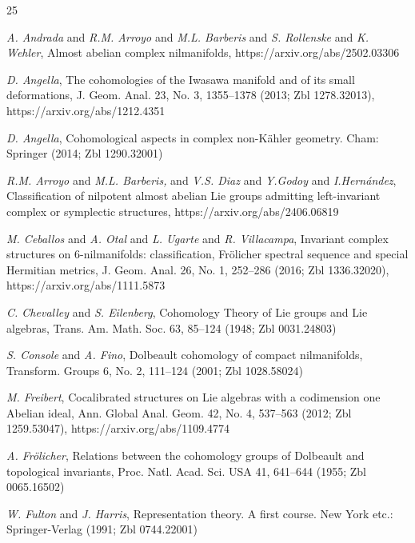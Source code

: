 \documentclass[leqno]{article}
\theoremstyle{definition}
\numberwithin{equation}{section}
\begin{document}
\begin{thebibliography}{25}

\textit{A. Andrada} and \textit{R.M. Arroyo} and \textit{M.L. Barberis} and \textit{S. Rollenske} and \textit{K. Wehler}, Almost abelian complex nilmanifolds, 
{\footnotesize\sf https://arxiv.org/abs/2502.03306} 

\textit{D. Angella}, The cohomologies of the Iwasawa manifold and of its small deformations, J. Geom. Anal. 23, No. 3, 1355--1378 (2013; Zbl 1278.32013),
{\footnotesize\sf https://arxiv.org/abs/1212.4351} 

\textit{D. Angella}, Cohomological aspects in complex non-Kähler geometry. Cham: Springer (2014; Zbl 1290.32001)

\textit{R.M. Arroyo} and \textit{M.L. Barberis,} and \textit{V.S. Diaz} and \textit{Y.Godoy} and \textit{I.Hernández}, Classification of nilpotent almost abelian Lie groups admitting left-invariant complex or symplectic structures, {\footnotesize\sf https://arxiv.org/abs/2406.06819} 

\textit{M. Ceballos} and \textit{A. Otal} and \textit{L. Ugarte} and \textit{R. Villacampa}, Invariant complex structures on 6-nilmanifolds: classification, Frölicher spectral sequence and special Hermitian metrics, J. Geom. Anal. 26, No. 1, 252--286 (2016; Zbl 1336.32020),
{\footnotesize\sf https://arxiv.org/abs/1111.5873} 

\textit{C. Chevalley} and \textit{S. Eilenberg}, Cohomology Theory of Lie groups and Lie algebras, Trans. Am. Math. Soc. 63, 85--124 (1948; Zbl 0031.24803)

\textit{S. Console} and \textit{A. Fino}, Dolbeault cohomology of compact nilmanifolds, Transform. Groups 6, No. 2, 111--124 (2001; Zbl 1028.58024)

 \textit{M. Freibert}, Cocalibrated structures on Lie algebras with a codimension one Abelian ideal, Ann. Global Anal. Geom. 42, No. 4, 537--563 (2012; Zbl 1259.53047),
{\footnotesize\sf https://arxiv.org/abs/1109.4774} 

\textit{A. Frölicher}, Relations between the cohomology groups of Dolbeault and topological invariants, Proc. Natl. Acad. Sci. USA 41, 641--644 (1955; Zbl 0065.16502)

\textit{W. Fulton} and \textit{J. Harris}, Representation theory. A first course. New York etc.: Springer-Verlag (1991; Zbl 0744.22001)


\end{thebibliography}
\end{document}
